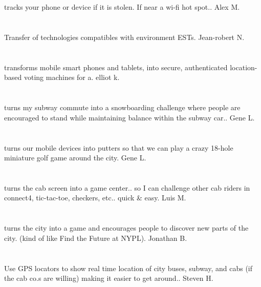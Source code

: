 \section{}tracks your phone or device if it is stolen. If near a wi-fi hot spot.. Alex M.
\section{}Transfer of technologies compatibles with environment ESTs. Jean-robert N.
\section{}transforms mobile smart phones and tablets‚ into secure,  authenticated location-based voting machines for a. elliot k.
\section{} turns my subway commute into a snowboarding challenge where people are encouraged to stand while maintaining balance within the subway car.. Gene L.
\section{}turns our mobile devices into putters so that we can play a crazy 18-hole miniature golf game around the city. Gene L.
\section{}turns the cab screen into a game center.. so I can challenge other cab riders in connect4,  tic-tac-toe,  checkers,  etc.. quick \& easy. Luis M.
\section{}turns the city into a game and encourages people to discover new parts of the city. (kind of like Find the Future at NYPL). Jonathan B.
\section{}Use GPS locators to show real time location of city buses,  subway,  and cabs (if the cab co.s are willing) making it easier to get around.. Steven H.
